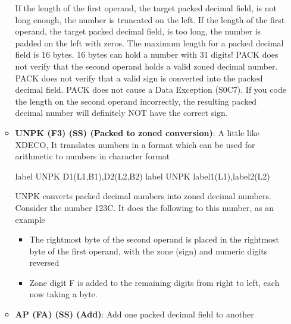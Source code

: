 \documentclass{report}
\begin{document}
\begin{itemize}
\begin{itemize}
                    If the length of the first operand, the target packed decimal field, is not long enough, the number is truncated on the left.
                    \bigbreak \noindent 
                    If the length of the first operand, the target packed decimal field, is too long, the number is padded on the left with zeros.
                    \bigbreak \noindent 
                    The maximum length for a packed decimal field is 16 bytes. 16 bytes can hold a number with 31 digits!
                    \bigbreak \noindent 
                    PACK does not verify that the second operand holds a valid zoned decimal number.
                    \bigbreak \noindent 
                    PACK does not verify that a valid sign is converted into the packed decimal field.
                    \bigbreak \noindent 
                    PACK does not cause a Data Exception (S0C7).
                    \bigbreak \noindent 
                    If you code the length on the second operand incorrectly, the resulting packed decimal number will definitely NOT have the correct sign.
                \item \textbf{UNPK (F3) (SS) (Packed to zoned conversion)}: A little like XDECO, It translates numbers in a format which can be used for arithmetic to numbers in character format
                    \bigbreak \noindent 
                    \begin{cppcode}
                        label UNPK D1(L1,B1),D2(L2,B2)
                        label UNPK label1(L1),label2(L2)
                    \end{cppcode}
                    \bigbreak \noindent 
                    UNPK converts packed decimal numbers into zoned decimal numbers. Consider the number 123C. It does the following to this number, as an example
                    \begin{itemize}
                        \item The rightmost byte of the second operand is placed in the rightmost byte of the first operand, with the zone (sign) and numeric digits reversed
                        \item Zone digit F is added to the remaining digits from right to left, each now taking a byte. 
                    \end{itemize}
                \item \textbf{AP (FA) (SS) (Add)}: Add one packed decimal field to another
                    \bigbreak \noindent 
                    \begin{cppcode}

\end{cppcode}
\end{itemize}
\end{itemize}
\end{document}
